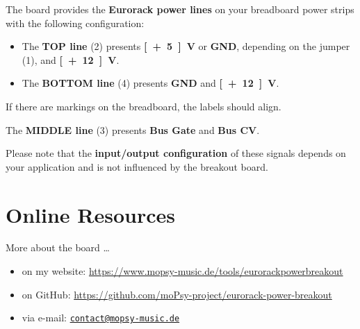 \documentclass[a4paper,
               11pt,
               parskip=half,
               headinclude,
               titlepage=false]{scrartcl}
\begin{document}
The board provides the \textbf{Eurorack power lines} on your breadboard power strips with the following configuration:
\begin{itemize}
 \item The \textbf{TOP line} (2) presents \textbf{\color{red}\unit[+5]V} or \textbf{\color{red}GND}, depending on the jumper (1), and \textbf{\color{red}\unit[+12]V}.
 \item The \textbf{BOTTOM line} (4) presents \textbf{\color{red}GND} and \textbf{\color{red}\unit[+12]V}.
\end{itemize}

If there are markings on the breadboard, the labels should align.


\vspace{2em}

The \textbf{MIDDLE line} (3) presents \textbf{\color{red}Bus Gate} and \textbf{\color{red}Bus CV}.

Please note that the \textbf{input/output configuration} of these signals depends on your application and is not influenced by the breakout board.


\section*{Online Resources}

More about the board  …
\begin{itemize}[noitemsep]
 \item on my website: \url{https://www.mopsy-music.de/tools/eurorackpowerbreakout}
 \item on GitHub: \url{https://github.com/moPsy-project/eurorack-power-breakout}
 \item via e-mail: \href{mailto:contact@mopsy-music.de}{\texttt{contact@mopsy-music.de}}
\end{itemize}
\end{document}
